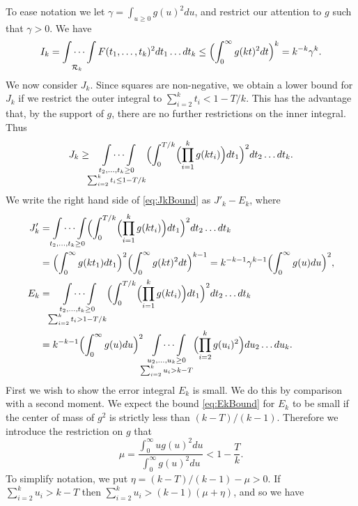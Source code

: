 \documentclass[12pt,a4paper]{amsart}
\theoremstyle{plain}
\numberwithin{sblmm}{thrm}
\numberwithin{equation}{section}
\begin{document}
To ease notation we let $\gamma=\int_{u\ge 0}g(u)^2du$, and restrict our attention to $g$ such that $\gamma>0$. We have
\begin{equation}
I_k=\idotsint\limits_{\mathcal{R}_k}F(t_1,\dotsc,t_k)^2 dt_1\dotsc dt_k\le \Bigl(\int_0^\infty g(kt)^2dt\Bigr)^k=k^{-k}\gamma^k.\label{eq:IkBound}
\end{equation}
We now consider $J_k$. Since squares are non-negative, we obtain a lower bound for $J_k$ if we restrict the outer integral to $\sum_{i=2}^kt_i<1-T/k$. This has the advantage that, by the support of $g$, there are no further restrictions on the inner integral. Thus
\begin{equation}
J_k\ge \idotsint\limits_{\substack{t_2,\dotsc,t_k\ge 0\\ \sum_{i=2}^k t_i\le 1-T/k}}\Bigl(\int_0^{T/k}\Bigl(\prod_{i=1}^kg(kt_i)\Bigr)dt_1\Bigr)^2dt_2\dotsc dt_k.\label{eq:JkBound}
\end{equation}
We write the right hand side of \eqref{eq:JkBound} as $J'_k-E_k$, where
\begin{align}
J'_k&=\idotsint\limits_{t_2,\dotsc,t_k\ge 0}\Bigl(\int_0^{T/k} \Bigl(\prod_{i=1}^kg(kt_i)\Bigr)dt_1\Bigr)^2dt_2\dotsc dt_k\nonumber\\
&=\Bigl(\int_0^\infty g(kt_1)dt_1\Bigr)^2\Bigl(\int_0^\infty g(kt)^2dt\Bigr)^{k-1}=k^{-k-1}\gamma^{k-1}\Bigl(\int_{0}^\infty g(u)du\Bigr)^2,\label{eq:Jk'}\\
E_k&=\idotsint\limits_{\substack{t_2,\dotsc,t_k\ge 0\\ \sum_{i=2}^k t_i>1-T/k}}\Bigl(\int_{0}^{T/k} \Bigl(\prod_{i=1}^k g(kt_i)\Bigr) dt_1\Bigr)^2dt_2\dotsc dt_k\nonumber\\
&= k^{-k-1}\Bigl(\int_0^\infty g(u)du\Bigr)^2 \idotsint\limits_{\substack{u_2,\dotsc,u_k\ge 0\\ \sum_{i=2}^ku_i>k-T}}\Bigl(\prod_{i=2}^k g(u_i)^2\Bigr)du_2\dotsc du_k.\label{eq:EkBound}
\end{align}
First we wish to show the error integral $E_k$ is small. We do this by comparison with a second moment. We expect the bound \eqref{eq:EkBound} for $E_k$ to be small if the center of mass of $g^2$ is strictly less than $(k-T)/(k-1)$. Therefore we introduce the restriction on $g$ that
\begin{equation}
\mu=\frac{\int_0^\infty ug(u)^2du}{\int_0^\infty g(u)^2du}<1-\frac{T}{k}.\label{eq:MuBound}
\end{equation}
To simplify notation, we put $\eta=(k-T)/(k-1)-\mu>0$. If $\sum_{i=2}^ku_i>k-T$ then $\sum_{i=2}^ku_i>(k-1)(\mu+\eta)$, and so we have
\end{document}
